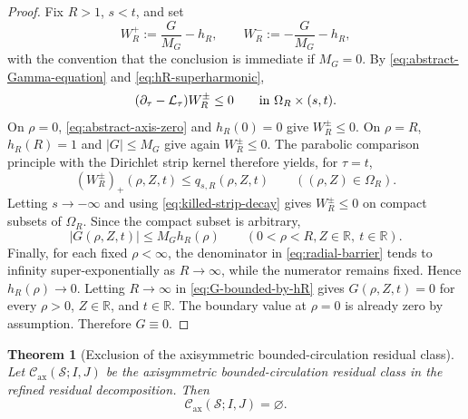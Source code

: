 \documentclass[11pt]{amsart}
\numberwithin{equation}{section}
\theoremstyle{plain}
\newtheorem{theorem}{Theorem}[section]
\theoremstyle{definition}
\theoremstyle{remark}
\newcommand{\Cax}{\mathcal C_{\mathrm{ax}}}
\begin{document}
\begin{proof}
Fix \(R>1\), \(s<t\), and set
\[
   W^+_{R}:=\frac{G}{M_G}-h_R,
   \qquad
   W^-_{R}:=-\frac{G}{M_G}-h_R,
\]
with the convention that the conclusion is immediate if \(M_G=0\).
By \eqref{eq:abstract-Gamma-equation} and \eqref{eq:hR-superharmonic},
\[
   (\partial_\tau-\mathcal L_\tau)W_R^\pm\le0
   \qquad\hbox{in }\Omega_R\times(s,t).
\]
On \(\rho=0\), \eqref{eq:abstract-axis-zero} and \(h_R(0)=0\) give
\(W_R^\pm\le0\).  On \(\rho=R\), \(h_R(R)=1\) and \(|G|\le M_G\) give again
\(W_R^\pm\le0\).  The parabolic comparison principle with the Dirichlet strip
kernel therefore yields, for \(\tau=t\),
\[
   (W_R^\pm)_+(\rho,Z,t)
   \le q_{s,R}(\rho,Z,t)
   \qquad ((\rho,Z)\in\Omega_R).
\]
Letting \(s\to-\infty\) and using \eqref{eq:killed-strip-decay} gives
\(W_R^\pm\le0\) on compact subsets of \(\Omega_R\).  Since the compact subset
is arbitrary,
\begin{equation}\label{eq:G-bounded-by-hR}
   |G(\rho,Z,t)|\le M_G h_R(\rho)
   \qquad (0<\rho<R, Z\in\mathbb R,
   \ t\in\mathbb R).
\end{equation}
Finally, for each fixed \(\rho<\infty\), the denominator in
\eqref{eq:radial-barrier} tends to infinity super-exponentially as
\(R\to\infty\), while the numerator remains fixed.  Hence
\(h_R(\rho)\to0\).  Letting \(R\to\infty\) in
\eqref{eq:G-bounded-by-hR} gives \(G(\rho,Z,t)=0\) for every
\(\rho>0\), \(Z\in\mathbb R\), and \(t\in\mathbb R\).  The boundary value at
\(\rho=0\) is already zero by assumption.  Therefore \(G\equiv0\).
\end{proof}

\begin{theorem}[Exclusion of the axisymmetric bounded-circulation residual class]
\label{thm:R1-exclusion}
Let \(\Cax(\mathcal S;I,J)\) be the axisymmetric bounded-circulation residual
class in the refined residual decomposition.  Then
\begin{equation}\label{eq:R1-empty}
   \Cax(\mathcal S;I,J)=\varnothing .
\end{equation}
\end{theorem}
\end{document}
